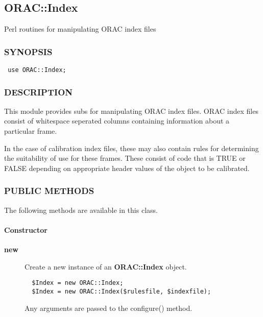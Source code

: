 \subsection{ORAC::Index\label{ORAC::Index}}

Perl routines for manipulating ORAC index files

\subsubsection*{SYNOPSIS\label{ORAC::Index_SYNOPSIS}}\begin{verbatim}
 use ORAC::Index;
\end{verbatim}
\subsubsection*{DESCRIPTION\label{ORAC::Index_DESCRIPTION}}

This module provides subs for manipulating ORAC index files. ORAC
index files consist of whitespace seperated columns containing
information about a particular frame.



In the case of calibration index files, these may also contain rules
for determining the suitability of use for these frames. These consist
of code that is TRUE or FALSE depending on appropriate header values
of the object to be calibrated.

\subsubsection*{PUBLIC METHODS\label{ORAC::Index_PUBLIC_METHODS}}

The following methods are available in this class.

\paragraph*{Constructor\label{ORAC::Index_Constructor}}\begin{description}
\item[\textbf{new}] \mbox{}

Create a new instance of an \textbf{ORAC::Index} object.

\begin{verbatim}
  $Index = new ORAC::Index;
  $Index = new ORAC::Index($rulesfile, $indexfile);
\end{verbatim}


Any arguments are passed to the configure() method.

\end{description}
